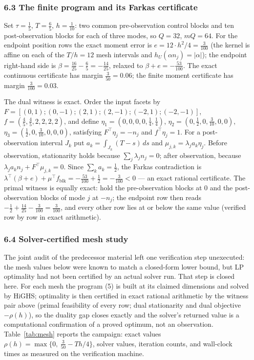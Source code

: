 \documentclass[10pt,twocolumn]{article}
\theoremstyle{definition}
\begin{document}
\subsubsection{6.3 The finite program and its Farkas certificate}\label{finst}

Set \(\tau = \tfrac15\), \(T = \tfrac65\), \(h = \tfrac1{10}\): two common
pre-observation control blocks and ten post-observation blocks for each of
three modes, so \(Q = 32\), \(mQ = 64\). For the endpoint position rows the
exact moment error is \(e = 12 \cdot h^2/4 = \tfrac{3}{100}\) (the kernel is
affine on each of the \(T/h = 12\) mesh intervals and
\(h_U(\alpha n_j) = |\alpha|\)); the endpoint right-hand side is \(\beta =
\tfrac{16}{25} - \tfrac65 = -\tfrac{14}{25}\), relaxed to \(\beta + e =
-\tfrac{53}{100}\). The exact continuous certificate has margin
\(\tfrac{3}{50} = 0.06\); the finite moment certificate has margin
\(\tfrac{3}{100} = 0.03\).

The dual witness is exact. Order the input facets by
\(F = [(0,1);(0,-1);(2,1);(2,-1);(-2,1);(-2,-1)]\), \(f = (\tfrac45, \tfrac45,
2, 2, 2, 2)\), and define \(\eta_1 = (0,0,0,0,\tfrac14,\tfrac14)\),
\(\eta_2 = (0,\tfrac12,0,\tfrac3{10},0,0)\),
\(\eta_3 = (\tfrac12,0,\tfrac3{10},0,0,0)\), satisfying \(F^\top \eta_j =
-n_j\) and \(f^\top \eta_j = 1\). For a post-observation interval \(J_k\)
put \(a_k = \int_{J_k} (T - s)\, ds\) and \(\mu_{j,k} = \lambda_j a_k
\eta_j\). Before observation, stationarity holds because \(\sum_j \lambda_j
n_j = 0\); after observation, because \(\lambda_j a_k n_j + F^\top \mu_{j,k}
= 0\). Since \(\sum_k a_k = \tfrac12\), the Farkas contradiction is
\(\lambda^\top(\beta + e) + \mu^\top f_{\mathrm{blk}} = -\tfrac{53}{100} +
\tfrac12 = -\tfrac{3}{100} < 0\) --- an exact rational certificate. The
primal witness is equally exact: hold the pre-observation blocks at \(0\) and
the post-observation blocks of mode \(j\) at \(-n_j\); the endpoint row then
reads \(-\tfrac12 + \tfrac{14}{25} - \tfrac{3}{100} = \tfrac{3}{100}\), and
every other row lies at or below the same value (verified row by row in exact
arithmetic).

\subsubsection{6.4 Solver-certified mesh study}\label{mesh}

The joint audit of the predecessor material left one verification step
unexecuted: the mesh values below were known to match a closed-form lower
bound, but LP optimality had not been certified by an actual solver run. That
step is closed here. For each mesh the program (5) is built at its claimed
dimensions and solved by HiGHS; optimality is then certified in exact rational
arithmetic by the witness pair above (primal feasibility of every row;
dual stationarity and dual objective \(-\rho(h)\)), so the duality gap closes
exactly and the solver's returned value is a computational confirmation of a
proved optimum, not an observation. Table~\ref{tab:mesh} reports the
campaign: exact values \(\rho(h) = \max\{0,\ \tfrac{3}{50} - Th/4\}\),
solver values, iteration counts, and wall-clock times as measured on the
verification machine.
\end{document}
